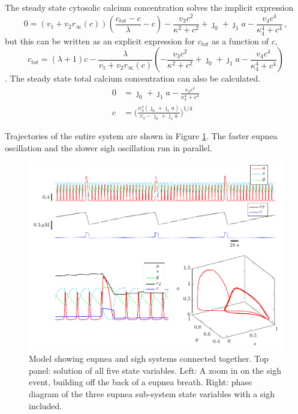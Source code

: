 \documentclass[12pt]{article}
\def\ctot{c_{tot}}
\def\rinf{r_\infty}
\def\rinf{r_\infty}
\begin{document}
The steady state cytosolic calcium concentration solves the implicit expression 
\begin{equation*}
0= (v_1 + v_2 \rinf (c) ) \left(\frac{\ctot-c}{\lambda} - c \right) - \frac{v_3 c^2 }{\kappa^2 + c^2} + \jmath_0 + \jmath_1 a -   \frac{v_4 c^4}{\kappa_4^4+c^4}  \, , 
\end{equation*}
but this can be written as an explicit expression for $\ctot$ as a function of $c$,
\begin{equation*}
\ctot = (\lambda+1 )  c  -  \frac{\lambda }{ v_1 + v_2 \rinf (c) } \left( - \frac{v_3 c^2 }{\kappa^2 + c^2} + \jmath_0 + \jmath_1 a -   \frac{v_4 c^4}{\kappa_4^4+c^4} \right) 
\end{equation*}.
The steady state total calcium concentration can also be calculated.
\begin{align*}
    0 &= \jmath_0 + \jmath_1 a -   \frac{v_4 c^4}{\kappa_4^4+c^4} \\
    c &= \Big(\frac{\kappa_4^4(\jmath_0 + \jmath_1 a)}{v_4-\jmath_0 + \jmath_1 a}\Big)^{1/4}
\end{align*}

Trajectories of the entire system are shown in Figure \ref{EupneaAndSighRepresentative}. The faster eupnea oscillation and the slower sigh oscillation run in parallel.

\begin{figure}[h!]
\centering
\includegraphics[width=\textwidth]{Fig04EupneaAndSighRepresentative.pdf}
\caption{Model showing eupnea and sigh systems connected together. Top panel: solution of all five state variables. Left: A zoom in on the sigh event, building off the back of a eupnea breath. Right: phase diagram of the three eupnea sub-system state variables with a sigh included.}
\label{EupneaAndSighRepresentative}
\end{figure}
\end{document}
